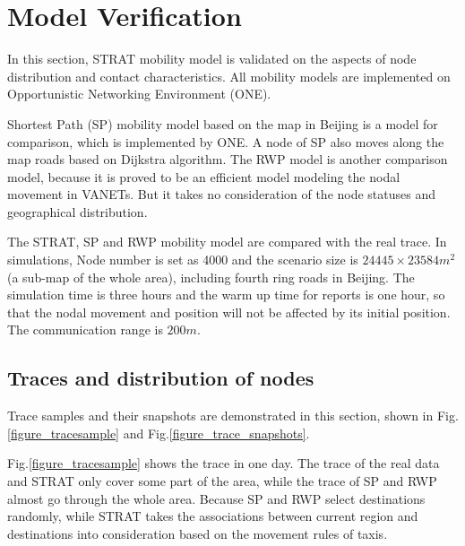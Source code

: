 \section{Model Verification}
\label{section_model_varification}
In this section, STRAT mobility model is validated on the aspects of node distribution and contact characteristics. All mobility models are implemented on Opportunistic Networking Environment (ONE)\cite{KeranenOtt-155}.

Shortest Path (SP) mobility model based on the map in Beijing is a model for comparison, which is implemented by ONE.  A node of SP also moves along the map roads based on Dijkstra algorithm.
The RWP model is another comparison model, because it is proved to be an efficient model modeling the nodal movement in VANETs. But it takes no consideration of the node statuses and geographical distribution.

The STRAT, SP and RWP mobility model are compared with the real trace.
In simulations, Node number is set as 4000 and the scenario size is $24445\times23584 m^2$ (a sub-map of the whole area), including fourth ring roads in Beijing. The simulation time is three hours and the warm up time for reports is one hour, so that the nodal movement and position will not be affected by its initial position. The communication range is $200m$.

\subsection{Traces and distribution of nodes}

Trace samples and their snapshots are demonstrated in this section, shown in Fig. \ref{figure_tracesample} and Fig.\ref{figure_trace_snapshots}.

Fig.\ref{figure_tracesample} shows the trace in one day. The trace of the real data and STRAT only cover some part of the area, while the trace of SP and RWP almost go through the whole area. Because SP and RWP select destinations randomly, while STRAT takes the associations between current region and destinations into consideration based on the movement rules of taxis.

